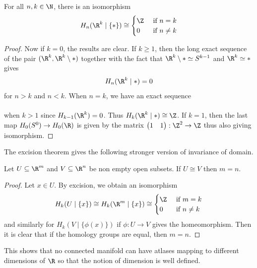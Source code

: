 \documentclass[a4paper]{article}
\begin{document}
\begin{prp}{}{} For all $n,k\in\N$, there is an isomorphism $$H_n(\R^k\;|\;\{\ast\})\cong\begin{cases}
\Z & \text{ if } n=k\\
0 & \text{ if } n\neq k
\end{cases}$$ 
\begin{proof}
Now if $k=0$, the results are clear. If $k\geq 1$, then the long exact sequence of the pair $(\R^k,\R^k\setminus\ast)$ together with the fact that $\R^k\setminus\ast\simeq S^{k-1}$ and $\R^k\simeq\ast$ gives $$H_n(\R^k\;|\;\ast)=0$$ for $n>k$ and $n<k$. When $n=k$, we have an exact sequence \\
\\
when $k>1$ since $H_{k-1}(\R^k)=0$. Thus $H_k(\R^k\;|\;\ast)\cong\Z$. If $k=1$, then the last map $H_0(S^0)\to H_0(\R)$ is given by the matrix $\begin{pmatrix}
1 & 1
\end{pmatrix}:\Z^2\to\Z$ thus also giving isomorphism. 
\end{proof}
\end{prp}

The excision theorem gives the following stronger version of invariance of domain. 

\begin{crl}{}{} Let $U\subseteq\R^m$ and $V\subseteq\R^n$ be non empty open subsets. If $U\cong V$ then $m=n$. 
\begin{proof}
Let $x\in U$. By excision, we obtain an isomorphism $$H_k(U\;|\;\{x\})\cong H_k(\R^m\;|\;\{x\})\cong\begin{cases}
\Z & \text{ if } m=k\\
0 & \text{ if } n\neq k
\end{cases}$$ and similarly for $H_k(V\;|\;\{\phi(x)\})$ if $\phi:U\to V$ gives the homeomorphism. Then it is clear that if the homology groups are equal, then $m=n$. 
\end{proof}
\end{crl}

This shows that no connected manifold can have atlases mapping to different dimensions of $\R$ so that the notion of dimension is well defined. 

\pagebreak
\end{document}
